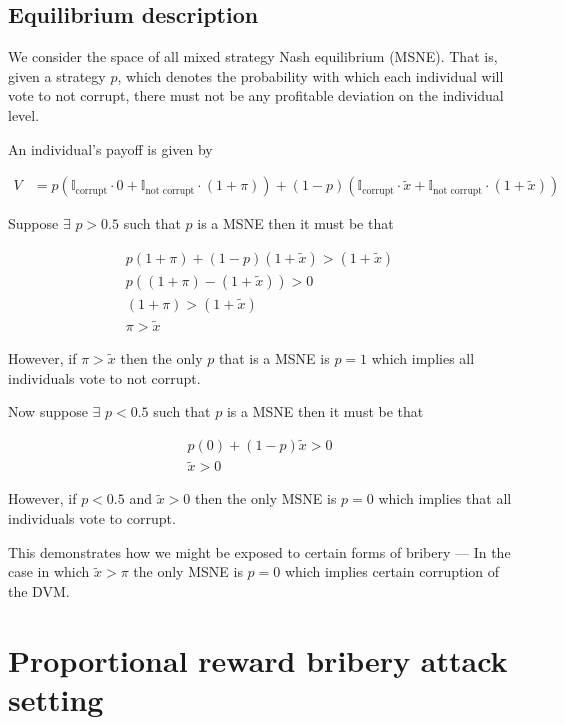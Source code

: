 \documentclass[12pt]{article}
\begin{document}
  \subsection{Equilibrium description}

    We consider the space of all mixed strategy Nash equilibrium (MSNE). That is, given a strategy
    $p$, which denotes the probability with which each individual will vote to not corrupt, there
    must not be any profitable deviation on the individual level.

    An individual's payoff is given by

    \begin{align*}
      V &= p (\mathbb{I}_{\text{corrupt}} \cdot 0 + \mathbb{I}_{\text{not corrupt}} \cdot (1 + \pi)) + (1 - p) (\mathbb{I}_{\text{corrupt}} \cdot \tilde{x} + \mathbb{I}_{\text{not corrupt}} \cdot (1 + \tilde{x}))
    \end{align*}

    Suppose $\exists$ $p > 0.5$ such that $p$ is a MSNE then it must be that

    \begin{align*}
      p (1 + \pi) + (1 - p) (1 + \tilde{x}) > (1 + \tilde{x}) \\
      p ((1 + \pi) - (1 + \tilde{x})) > 0 \\
      (1 + \pi) > (1 + \tilde{x}) \\
      \pi > \tilde{x}
    \end{align*}

    However, if $\pi > \tilde{x}$ then the only $p$ that is a MSNE is $p = 1$ which implies
    all individuals vote to not corrupt.

    Now suppose $\exists$ $p < 0.5$ such that $p$ is a MSNE then it must be that

    \begin{align*}
      p (0) + (1 - p) \tilde{x} > 0 \\
      \tilde{x} > 0
    \end{align*}

    However, if $p < 0.5$ and $\tilde{x} > 0$ then the only MSNE is $p = 0$ which implies that all
    individuals vote to corrupt.

    This demonstrates how we might be exposed to certain forms of bribery --- In the case in which
    $\tilde{x} > \pi$ the only MSNE is $p = 0$ which implies certain corruption of the DVM.


\section{Proportional reward bribery attack setting}
\end{document}
